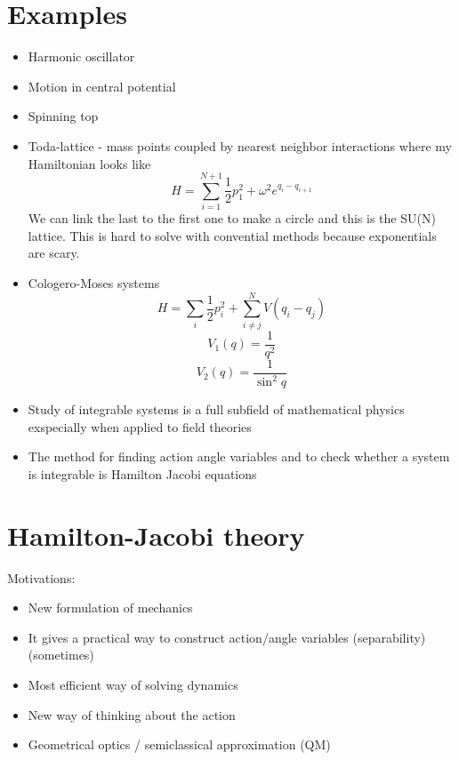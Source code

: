 \documentclass[12pt]{article} %
\begin{document}
\section{Examples}
\begin{itemize}
\item Harmonic oscillator
\item Motion in central potential
\item Spinning top
\item Toda-lattice - mass points coupled by nearest neighbor
  interactions where my Hamiltonian looks like
\begin{equation}
H = \sum_{i = 1}^{N+1} \frac{1}{2} p_1^2 + \omega^2 e^{q_i - q_{i+1}}
\end{equation}
We can link the last to the first one to make a circle and this is the
SU(N) lattice. This is hard to solve with convential methods because
exponentials are scary. 
\item Cologero-Moses systems
\begin{equation}
H = \sum_i \frac{1}{2} p_i^2 + \sum_{i\ne j}^N V(q_i - q_j)
\end{equation}
\begin{equation}
V_1(q) = \frac{1}{q^2}
\end{equation}
\begin{equation}
V_2(q) = \frac{1}{\sin^2 q}
\end{equation}
\item Study of integrable systems is a full subfield of mathematical
  physics exspecially when applied to field theories
\item The method for finding action angle variables and to check
  whether a system is integrable is Hamilton Jacobi equations
\end{itemize}

\section{Hamilton-Jacobi theory}

Motivations:
\begin{itemize}
\item New formulation of mechanics
\item It gives a practical way to construct action/angle variables (separability) (sometimes)
\item Most efficient way of solving dynamics
\item New way of thinking about the action
\item Geometrical optics / semiclassical approximation (QM)
\end{itemize}
\end{document}
